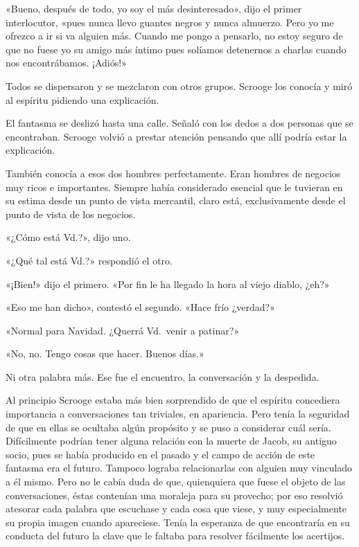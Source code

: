 \documentclass{novela}
\begin{document}
 «Bueno, después de todo, yo soy el más desinteresado», dijo el primer interlocutor, «pues nunca llevo guantes negros y nunca almuerzo. Pero yo me ofrezco a ir si va alguien más. Cuando me pongo a pensarlo, no estoy seguro de que no fuese yo su amigo más íntimo pues solíamos detenernos a charlas cuando nos encontrábamos. ¡Adiós!»

 Todos se dispersaron y se mezclaron con otros grupos. Scrooge los conocía y miró al espíritu pidiendo una explicación.

 El fantasma se deslizó hasta una calle. Señaló con los dedos a dos personas que se encontraban. Scrooge volvió a prestar atención pensando que allí podría estar la explicación.

 También conocía a esos dos hombres perfectamente. Eran hombres de negocios muy ricos e importantes. Siempre había considerado esencial que le tuvieran en su estima desde un punto de vista mercantil, claro está, exclusivamente desde el punto de vista de los negocios.

 «¿Cómo está Vd.?», dijo uno.

 «¿Qué tal está Vd.?» respondió el otro.

 «¡Bien!» dijo el primero. «Por fin le ha llegado la hora al viejo diablo, ¿eh?»

 «Eso me han dicho», contestó el segundo. «Hace frío ¿verdad?»

 «Normal para Navidad. ¿Querrá Vd.\ venir a patinar?»

 «No, no. Tengo cosas que hacer. Buenos días.»

 Ni otra palabra más. Ese fue el encuentro, la conversación y la despedida.

 Al principio Scrooge estaba más bien sorprendido de que el espíritu concediera importancia a conversaciones tan triviales, en apariencia. Pero tenía la seguridad de que en ellas se ocultaba algún propósito y se puso a considerar cuál sería. Difícilmente podrían tener alguna relación con la muerte de Jacob, su antiguo socio, pues se había producido en el pasado y el campo de acción de este fantasma era el futuro. Tampoco lograba relacionarlas con alguien muy vinculado a él mismo. Pero no le cabía duda de que, quienquiera que fuese el objeto de las conversaciones, éstas contenían una moraleja para su provecho; por eso resolvió atesorar cada palabra que escuchase y cada cosa que viese, y muy especialmente su propia imagen cuando apareciese. Tenía la esperanza de que encontraría en su conducta del futuro la clave que le faltaba para resolver fácilmente los acertijos.
\end{document}
